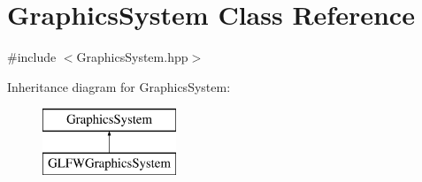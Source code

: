 \hypertarget{class_graphics_system}{}\section{Graphics\+System Class Reference}
\label{class_graphics_system}


{\ttfamily \#include $<$Graphics\+System.\+hpp$>$}

Inheritance diagram for Graphics\+System\+:\begin{figure}[H]
\begin{center}
\leavevmode
\includegraphics[height=2.000000cm]{class_graphics_system}
\end{center}
\end{figure}
